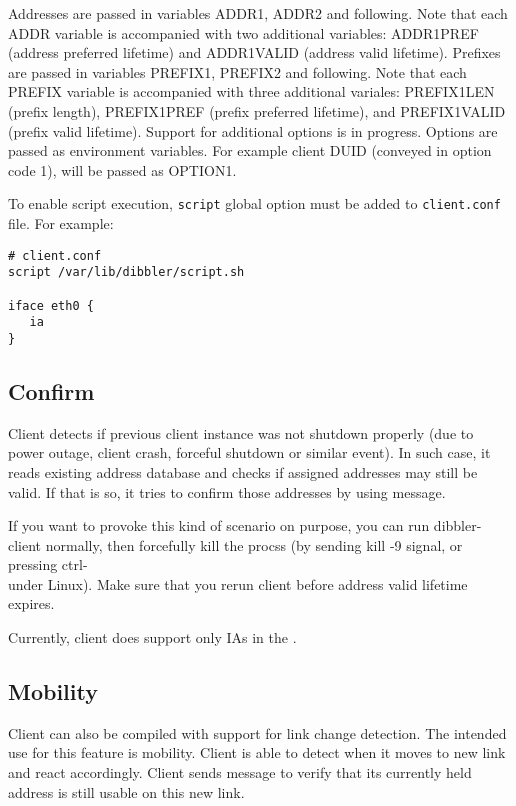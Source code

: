 Addresses are passed in variables ADDR1, ADDR2 and following. Note
that each ADDR variable is accompanied with two additional variables:
ADDR1PREF (address preferred lifetime) and ADDR1VALID (address valid
lifetime). Prefixes are passed in variables PREFIX1, PREFIX2 and
following. Note that each PREFIX variable is accompanied with three
additional variales: PREFIX1LEN (prefix length), PREFIX1PREF (prefix
preferred lifetime), and PREFIX1VALID (prefix valid lifetime). Support
for additional options is in progress. Options are passed as
environment variables. For example client DUID (conveyed in option
code 1), will be passed as OPTION1.

To enable script execution, \verb+script+ global option must
be added to \verb+client.conf+ file. For example:

\begin{lstlisting}
# client.conf
script /var/lib/dibbler/script.sh

iface eth0 {
   ia
}
\end{lstlisting}

\subsection{Confirm}
\label{feature-confirm}
Client detects if previous client instance was not shutdown properly
(due to power outage, client crash, forceful shutdown or similar
event). In such case, it reads existing address database and checks if
assigned addresses may still be valid. If that is so, it tries to
confirm those addresses by using  message.

If you want to provoke this kind of scenario on purpose, you can run
dibbler-client normally, then forcefully kill the procss (by sending
kill -9 signal, or pressing ctrl-\\ under Linux). Make sure that you
rerun client before address valid lifetime expires.

Currently, client does support only IAs in the .

\subsection{Mobility}
Client can also be compiled with support for link change detection.
The intended use for this feature is mobility. Client is able to
detect when it moves to new link and react accordingly. Client sends
 message to verify that its currently held address is
still usable on this new link.

